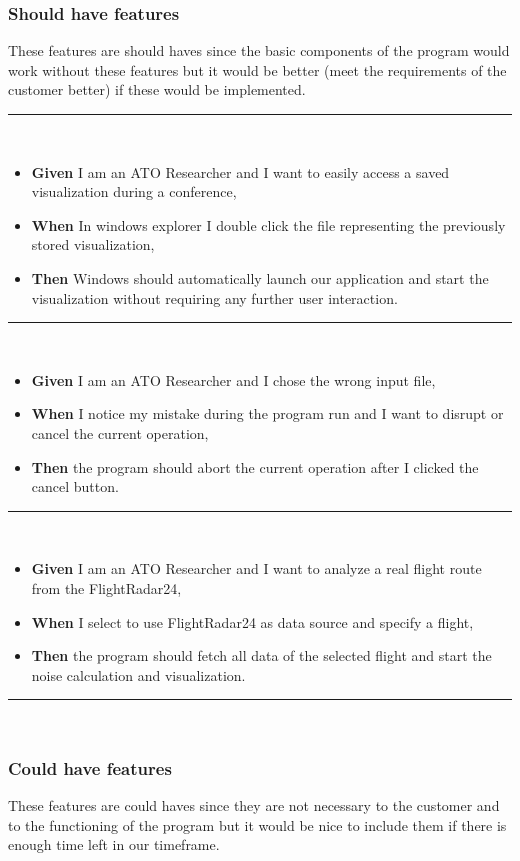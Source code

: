\subsubsection{Should have features}
These features are should haves since the basic components of the program would work without these features but it would be better (meet the requirements of the customer better) if these would be implemented. 

\noindent\rule{8cm}{0.4pt}\\
\begin{itemize}
\item \textbf{Given} I am an ATO Researcher and I want to easily access a saved visualization during a conference, 
\item \textbf{When} In windows explorer I double click the file representing the previously stored visualization,
\item \textbf{Then} Windows should automatically launch our application and start the visualization without requiring any further user interaction.
\end{itemize}
\noindent\rule{8cm}{0.4pt}\\
\begin{itemize}
\item \textbf{Given} I am an ATO Researcher and I chose the wrong input file,
\item \textbf{When} I notice my mistake during the program run and I want to disrupt or cancel the current operation,
\item \textbf{Then} the program should abort the current operation after I clicked the cancel button.
\end{itemize}
\noindent\rule{8cm}{0.4pt}\\
\begin{itemize}
\item \textbf{Given} I am an ATO Researcher and I want to analyze a real flight route from the FlightRadar24,
\item \textbf{When} I select to use FlightRadar24 as data source and specify a flight,
\item \textbf{Then} the program should fetch all data of the selected flight and start the noise calculation and visualization.
\end{itemize}
\noindent\rule{8cm}{0.4pt}\\

\subsubsection{Could have features} 
These features are could haves since they are not necessary to the customer and to the functioning of the program but it would be nice to include them if there is enough time left in our timeframe. 

